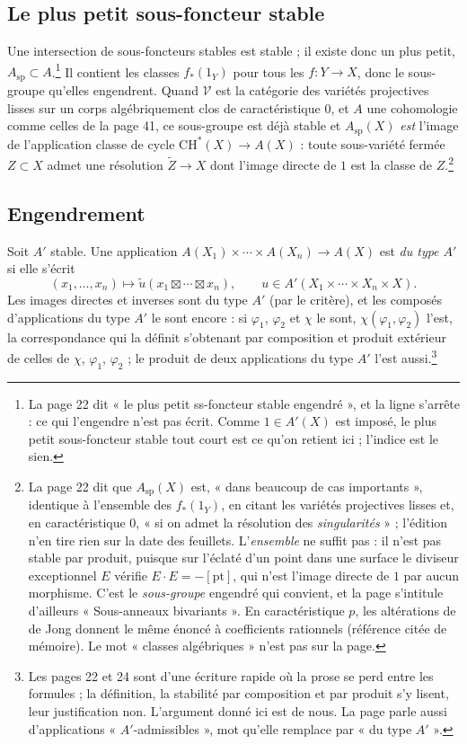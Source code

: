 \documentclass[11pt,a4paper]{article}
\begin{document}
\subsection*{Le plus petit sous-foncteur stable}

Une intersection de sous-foncteurs stables est stable ; il existe donc un plus
petit, $A_{\mathrm{sp}} \subset A$.\footnote{La page 22 dit « le plus petit
ss-foncteur stable engendré », et la ligne s'arrête : ce qui l'engendre n'est
pas écrit. Comme $1 \in A'(X)$ est imposé, le plus petit sous-foncteur stable
tout court est ce qu'on retient ici ; l'indice est le sien.} Il contient les
classes $f_{*}(1_{Y})$ pour tous les $f \colon Y \to X$, donc le sous-groupe
qu'elles engendrent. Quand $\mathcal{V}$ est la catégorie des variétés
projectives lisses sur un corps algébriquement clos de caractéristique $0$, et
$A$ une cohomologie comme celles de la page 41, ce sous-groupe est déjà stable
et $A_{\mathrm{sp}}(X)$ \emph{est} l'image de l'application classe de cycle
$\mathrm{CH}^{*}(X) \to A(X)$ : toute sous-variété fermée $Z \subset X$ admet
une résolution $\tilde{Z} \to X$ dont l'image directe de $1$ est la classe de
$Z$.\footnote{La page 22 dit que $A_{\mathrm{sp}}(X)$ est, « dans beaucoup de
cas importants », identique à l'ensemble des $f_{*}(1_{Y})$, en citant les
variétés projectives lisses et, en caractéristique $0$, « si on admet la
résolution des \emph{singularités} » ; l'édition n'en tire rien sur la date des
feuillets. L'\emph{ensemble} ne suffit
pas : il n'est pas stable par produit, puisque sur l'éclaté d'un point dans
une surface le diviseur exceptionnel $E$ vérifie $E \cdot E = -[\mathrm{pt}]$,
qui n'est l'image directe de $1$ par aucun morphisme. C'est le
\emph{sous-groupe} engendré qui convient, et la page s'intitule d'ailleurs
« Sous-anneaux bivariants ». En caractéristique $p$, les altérations de de Jong
donnent le même énoncé à coefficients rationnels (référence citée de
mémoire). Le mot « classes
algébriques » n'est pas sur la page.}

\subsection*{Engendrement}

Soit $A'$ stable. Une application
$A(X_{1}) \times \cdots \times A(X_{n}) \to A(X)$ est \emph{du type $A'$} si
elle s'écrit
\[ (x_{1}, \ldots, x_{n}) \longmapsto \tilde{u}(x_{1} \boxtimes \cdots \boxtimes x_{n}) , \qquad u \in A'(X_{1} \times \cdots \times X_{n} \times X) . \]
Les images directes et inverses sont du type $A'$ (par le critère), et les
composés d'applications du type $A'$ le sont encore : si $\varphi_{1}$,
$\varphi_{2}$ et $\chi$ le sont, $\chi(\varphi_{1}, \varphi_{2})$ l'est, la
correspondance qui la définit s'obtenant par composition et produit extérieur
de celles de $\chi$, $\varphi_{1}$, $\varphi_{2}$ ; le produit de deux
applications du type $A'$ l'est aussi.\footnote{Les pages 22 et 24 sont d'une
écriture rapide où la prose se perd entre les formules ; la définition, la
stabilité par composition et par produit s'y lisent, leur justification non.
L'argument donné ici est de nous. La page parle aussi d'applications
« $A'$-admissibles », mot qu'elle remplace par « du type $A'$ ».}
\end{document}

